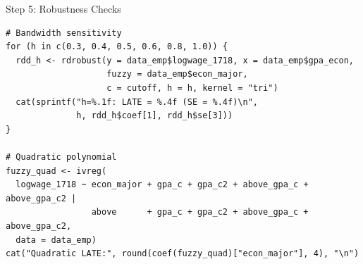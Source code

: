 \documentclass[hyperref={pdfpagelabels=false}]{beamer}
\begin{document}
\begin{frame}[fragile]{Step 5: Robustness Checks}
\begin{lstlisting}[style=r-style]
# Bandwidth sensitivity
for (h in c(0.3, 0.4, 0.5, 0.6, 0.8, 1.0)) {
  rdd_h <- rdrobust(y = data_emp$logwage_1718, x = data_emp$gpa_econ,
                    fuzzy = data_emp$econ_major,
                    c = cutoff, h = h, kernel = "tri")
  cat(sprintf("h=%.1f: LATE = %.4f (SE = %.4f)\n",
              h, rdd_h$coef[1], rdd_h$se[3]))
}

# Quadratic polynomial
fuzzy_quad <- ivreg(
  logwage_1718 ~ econ_major + gpa_c + gpa_c2 + above_gpa_c + above_gpa_c2 |
                 above      + gpa_c + gpa_c2 + above_gpa_c + above_gpa_c2,
  data = data_emp)
cat("Quadratic LATE:", round(coef(fuzzy_quad)["econ_major"], 4), "\n")
\end{lstlisting}
\end{frame}
\end{document}
